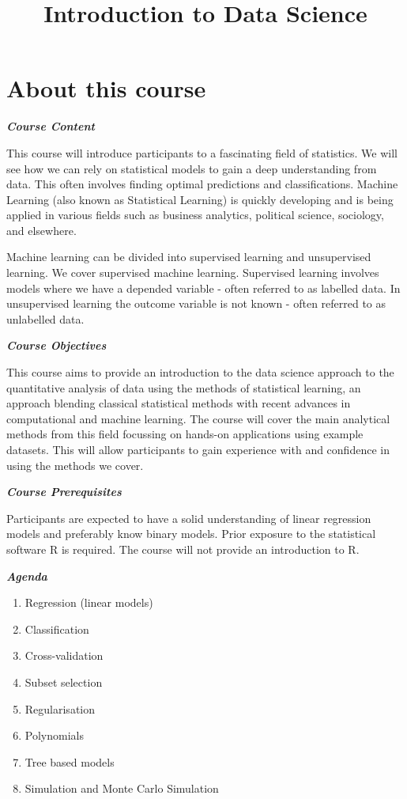 \documentclass[]{article}
\title{Introduction to Data Science}
\author{}
\date{}
\providecommand{\tightlist}{%
  \setlength{\itemsep}{0pt}\setlength{\parskip}{0pt}}
\begin{document}
\maketitle

{
\setcounter{tocdepth}{2}
\tableofcontents
}
\hypertarget{about-this-course}{%
\section*{About this course}\label{about-this-course}}

\textbf{\emph{Course Content}}

This course will introduce participants to a fascinating field of statistics. We will see how we can rely on statistical models to gain a deep understanding from data. This often involves finding optimal predictions and classifications. Machine Learning (also known as Statistical Learning) is quickly developing and is being applied in various fields such as business analytics, political science, sociology, and elsewhere.

Machine learning can be divided into supervised learning and unsupervised learning. We cover supervised machine learning. Supervised learning involves models where we have a depended variable - often referred to as labelled data. In unsupervised learning the outcome variable is not known - often referred to as unlabelled data.

\textbf{\emph{Course Objectives}}

This course aims to provide an introduction to the data science approach to the quantitative analysis of data using the methods of statistical learning, an approach blending classical statistical methods with recent advances in computational and machine learning. The course will cover the main analytical methods from this field focussing on hands-on applications using example datasets. This will allow participants to gain experience with and confidence in using the methods we cover.

\textbf{\emph{Course Prerequisites}}

Participants are expected to have a solid understanding of linear regression models and preferably know binary models. Prior exposure to the statistical software R is required. The course will not provide an introduction to R.

\textbf{\emph{Agenda}}

\begin{enumerate}
\def\labelenumi{\arabic{enumi}.}
\tightlist
\item
  Regression (linear models)
\item
  Classification
\item
  Cross-validation
\item
  Subset selection
\item
  Regularisation
\item
  Polynomials
\item
  Tree based models
\item
  Simulation and Monte Carlo Simulation
\end{enumerate}
\end{document}
